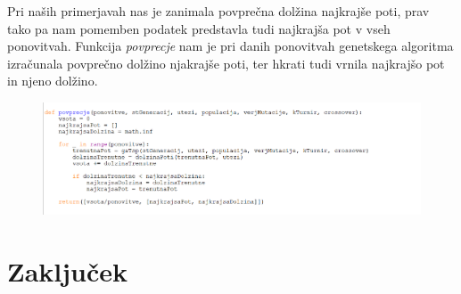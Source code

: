 \documentclass[12pt,a4paper]{amsart}
\theoremstyle{definition} %
\theoremstyle{plain} %
\begin{document}
Pri naših primerjavah nas je zanimala povprečna dolžina najkrajše poti, prav tako pa nam pomemben podatek predstavla tudi najkrajša pot v vseh ponovitvah. Funkcija \textit{povprecje} nam je pri danih ponovitvah genetskega algoritma izračunala povprečno dolžino njakrajše poti, ter hkrati tudi vrnila najkrajšo pot in njeno dolžino.

\begin{figure}[ht]
\centering
\includegraphics[width=1\textwidth]{povprecje}
\end{figure}
\newpage

\section{Zaključek}
\end{document}
